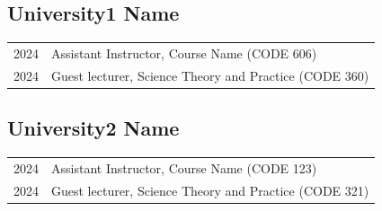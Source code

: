 
\subsection*{University1 Name}
% 
\begin{longtable}[l]{@{}p{} p{}@{}}

    2024 & Assistant Instructor, Course Name (CODE 606) \\
    
    2024 & Guest lecturer, Science Theory and Practice (CODE 360) \\

\end{longtable}


\subsection*{University2 Name}
% 
\begin{longtable}[l]{@{}p{} p{}@{}}

    2024 & Assistant Instructor, Course Name (CODE 123) \\
    
    2024 & Guest lecturer, Science Theory and Practice (CODE 321) \\

\end{longtable}